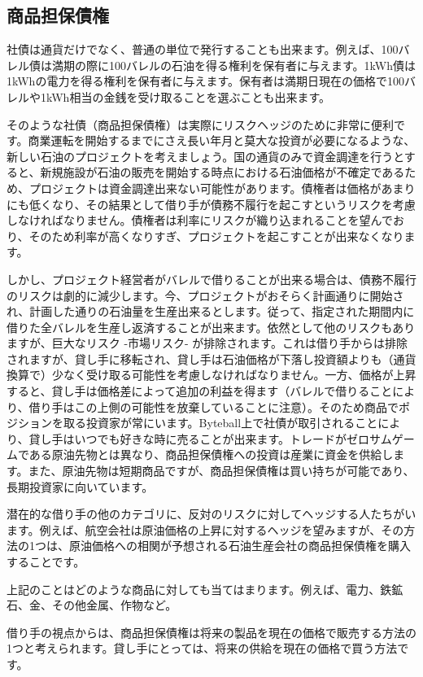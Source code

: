 \documentclass[a4paper, dvipdfmx]{jsarticle}
\begin{document}
\subsection{商品担保債権}
社債は通貨だけでなく、普通の単位で発行することも出来ます。例えば、100バレル債は満期の際に100バレルの石油を得る権利を保有者に与えます。1kWh債は1kWhの電力を得る権利を保有者に与えます。保有者は満期日現在の価格で100バレルや1kWh相当の金銭を受け取ることを選ぶことも出来ます。

そのような社債（商品担保債権）は実際にリスクヘッジのために非常に便利です。商業運転を開始するまでにさえ長い年月と莫大な投資が必要になるような、新しい石油のプロジェクトを考えましょう。国の通貨のみで資金調達を行うとすると、新規施設が石油の販売を開始する時点における石油価格が不確定であるため、プロジェクトは資金調達出来ない可能性があります。債権者は価格があまりにも低くなり、その結果として借り手が債務不履行を起こすというリスクを考慮しなければなりません。債権者は利率にリスクが織り込まれることを望んでおり、そのため利率が高くなりすぎ、プロジェクトを起こすことが出来なくなります。

しかし、プロジェクト経営者がバレルで借りることが出来る場合は、債務不履行のリスクは劇的に減少します。今、プロジェクトがおそらく計画通りに開始され、計画した通りの石油量を生産出来るとします。従って、指定された期間内に借りた全バレルを生産し返済することが出来ます。依然として他のリスクもありますが、巨大なリスク -市場リスク- が排除されます。これは借り手からは排除されますが、貸し手に移転され、貸し手は石油価格が下落し投資額よりも（通貨換算で）少なく受け取る可能性を考慮しなければなりません。一方、価格が上昇すると、貸し手は価格差によって追加の利益を得ます（バレルで借りることにより、借り手はこの上側の可能性を放棄していることに注意）。そのため商品でポジションを取る投資家が常にいます。Byteball上で社債が取引されることにより、貸し手はいつでも好きな時に売ることが出来ます。トレードがゼロサムゲームである原油先物とは異なり、商品担保債権への投資は産業に資金を供給します。また、原油先物は短期商品ですが、商品担保債権は買い持ちが可能であり、長期投資家に向いています。

潜在的な借り手の他のカテゴリに、反対のリスクに対してヘッジする人たちがいます。例えば、航空会社は原油価格の上昇に対するヘッジを望みますが、その方法の1つは、原油価格への相関が予想される石油生産会社の商品担保債権を購入することです。

上記のことはどのような商品に対しても当てはまります。例えば、電力、鉄鉱石、金、その他金属、作物など。

借り手の視点からは、商品担保債権は将来の製品を現在の価格で販売する方法の1つと考えられます。貸し手にとっては、将来の供給を現在の価格で買う方法です。
\end{document}
